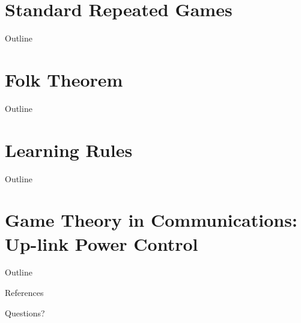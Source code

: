 \documentclass[10pt]{beamer}
\begin{document}


\section{Standard Repeated Games}
\begin{frame}{Outline}
    \tableofcontents[currentsection]
\end{frame}



\section{Folk Theorem}
\begin{frame}{Outline}
    \tableofcontents[currentsection]
\end{frame}



\section{Learning Rules}
\begin{frame}{Outline}
    \tableofcontents[currentsection]
\end{frame}



\section{Game Theory in Communications: Up-link Power Control}
\begin{frame}{Outline}
    \tableofcontents[currentsection]
\end{frame}



\begin{frame}{References}
    \nocite{*}
    
    
\end{frame}

\begin{frame}[standout]
    Questions?
\end{frame}
\end{document}
